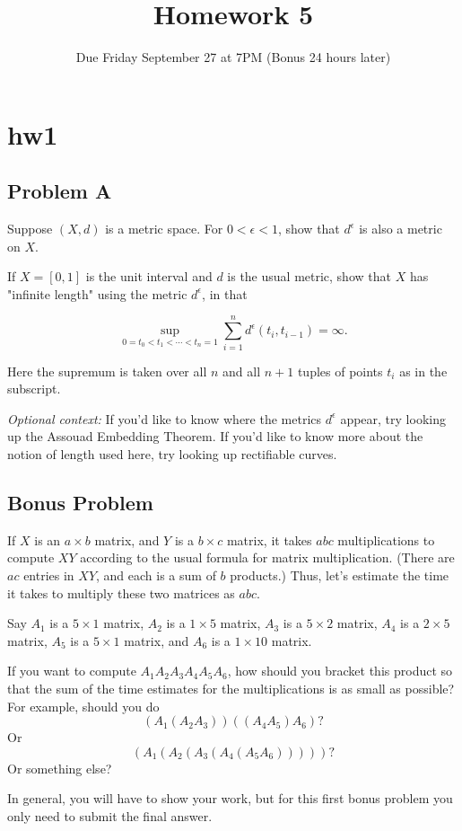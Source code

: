 \documentclass[lang=en,11pt]{template}
\title{Homework 5}
\author{}
\date{Due Friday September 27 at 7PM (Bonus 24 hours later)}
\begin{document}
   

\chapter{hw1}

\section*{Problem A}
Suppose \((X, d)\) is a metric space. For \(0 < \epsilon < 1\), show that \(d^\epsilon\) is also a metric on \(X\).

If \(X = [0, 1]\) is the unit interval and \(d\) is the usual metric, show that \(X\) has "infinite length" using the metric \(d^\epsilon\), in that

\[
\sup_{0 = t_0 < t_1 < \cdots < t_n = 1} \sum_{i=1}^{n} d^\epsilon(t_i, t_{i-1}) = \infty.
\]

Here the supremum is taken over all \(n\) and all \(n + 1\) tuples of points \(t_i\) as in the subscript.

\textit{Optional context:} If you’d like to know where the metrics \(d^\epsilon\) appear, try looking up the Assouad Embedding Theorem. If you’d like to know more about the notion of length used here, try looking up rectifiable curves.

\section*{Bonus Problem}
If \(X\) is an \(a \times b\) matrix, and \(Y\) is a \(b \times c\) matrix, it takes \(abc\) multiplications to compute \(XY\) according to the usual formula for matrix multiplication. (There are \(ac\) entries in \(XY\), and each is a sum of \(b\) products.) Thus, let’s estimate the time it takes to multiply these two matrices as \(abc\).

Say \(A_1\) is a \(5 \times 1\) matrix, \(A_2\) is a \(1 \times 5\) matrix, \(A_3\) is a \(5 \times 2\) matrix, \(A_4\) is a \(2 \times 5\) matrix, \(A_5\) is a \(5 \times 1\) matrix, and \(A_6\) is a \(1 \times 10\) matrix.

If you want to compute \(A_1 A_2 A_3 A_4 A_5 A_6\), how should you bracket this product so that the sum of the time estimates for the multiplications is as small as possible? For example, should you do
\[
(A_1 (A_2 A_3)) ((A_4 A_5) A_6)?
\]
Or
\[
(A_1 (A_2 (A_3 (A_4 (A_5 A_6)))))?
\]
Or something else?

In general, you will have to show your work, but for this first bonus problem you only need to submit the final answer.
\end{document}
